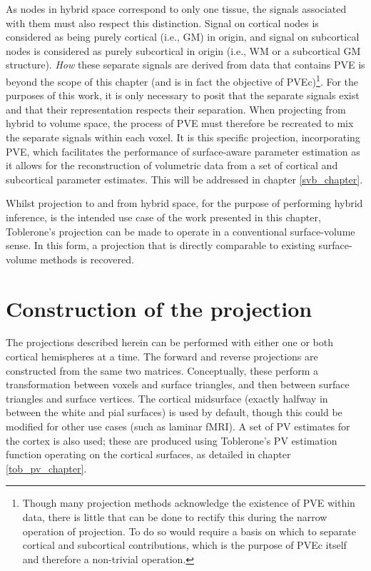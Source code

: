 As nodes in hybrid space correspond to only one tissue, the signals associated with them must also respect this distinction. Signal on cortical nodes is considered as being purely cortical (i.e., GM) in origin, and signal on subcortical nodes is considered as purely subcortical in origin (i.e., WM or a subcortical GM structure). \textit{How} these separate signals are derived from data that contains PVE is beyond the scope of this chapter (and is in fact the objective of PVEc)\footnote{Though many projection methods acknowledge the existence of PVE within data, there is little that can be done to rectify this during the narrow operation of projection. To do so would require a basis on which to separate cortical and subcortical contributions, which is the purpose of PVEc itself and therefore a non-trivial operation.}. For the purposes of this work, it is only necessary to posit that the separate signals exist and that their representation respects their separation. When projecting from hybrid to volume space, the process of PVE must therefore be recreated to mix the separate signals within each voxel. It is this specific projection, incorporating PVE, which facilitates the performance of surface-aware parameter estimation as it allows for the reconstruction of volumetric data from a set of cortical and subcortical parameter estimates. This will be addressed in chapter \ref{svb_chapter}. 

Whilst projection to and from hybrid space, for the purpose of performing hybrid inference, is the intended use case of the work presented in this chapter, Toblerone's projection can be made to operate in a conventional surface-volume sense. In this form, a projection that is directly comparable to existing surface-volume methods is recovered. 

\section{Construction of the projection}

The projections described herein can be performed with either one or both cortical hemispheres at a time. The forward and reverse projections are constructed from the same two matrices. Conceptually, these perform a transformation between voxels and surface triangles, and then between surface triangles and surface vertices. The cortical midsurface (exactly halfway in between the white and pial surfaces) is used by default, though this could be modified for other use cases (such as laminar fMRI). A set of PV estimates for the cortex is also used; these are produced using Toblerone's PV estimation function operating on the cortical surfaces, as detailed in chapter \ref{tob_pv_chapter}.


